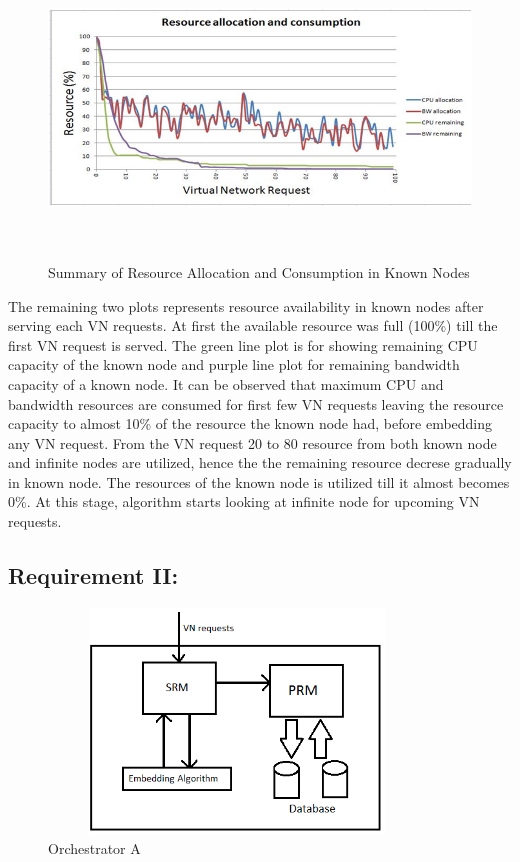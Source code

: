 \documentclass[article,dr=phil,type=msc ,colorback,accentcolor=tud4b]{tudthesis}
\begin{document}
\begin{figure}[h]
	\centering
	\includegraphics[width=15cm, height=8cm]{RES_CON_PE.png}
	\caption{Summary of Resource Allocation and Consumption in Known Nodes}
	\label{resr_consumption}
\end{figure}
The remaining two plots represents resource availability in known nodes after serving each VN requests. At first the available resource was full (100\%) till the first VN request is served. The green line plot is for showing remaining CPU capacity of the known node and purple line plot for remaining bandwidth capacity of a known node. It can be observed that maximum CPU and bandwidth resources are consumed for first few VN requests leaving the resource capacity to almost 10\% of the resource the known node had, before embedding any VN request. From the VN request 20 to 80 resource from both known node and infinite nodes are utilized, hence the the remaining resource decrese gradually in known node. The resources of the known node is utilized till it almost becomes 0\%. At this stage, algorithm starts looking at infinite node for upcoming VN requests. 
\newpage
\subsection{Requirement II: }

\begin{figure}[h]
	\centering
	\includegraphics[width=10cm, height=6cm]{orch.jpg}
	\caption{Orchestrator A}
	\label{fig: Orchestrator A}
\end{figure}
\end{document}

